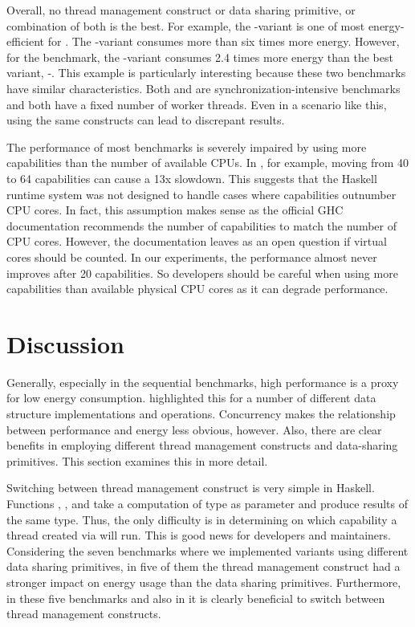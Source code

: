 Overall, no thread management construct or data sharing primitive, or combination of both is the best. For example, the \forkIO-\TMVar variant is one of most energy-efficient for \dining. The \forkOS-\TMVar variant consumes more than six times more energy. However, for the \chameneos benchmark, the \forkIO-\TMVar variant consumes 2.4 times more energy than the best variant, \forkIO-\MVar. This example is particularly interesting because these two benchmarks have similar characteristics. Both \dining and \chameneos are synchronization-intensive benchmarks and both have a fixed number of worker threads. Even in a scenario like this, using the same constructs can lead to discrepant results.
\newline

 The performance of most benchmarks is severely impaired by using more capabilities than the number of available CPUs. In \chameneos, for example, moving from 40 to 64 capabilities can cause a 13x slowdown. This suggests that the Haskell runtime system was not designed to handle cases where capabilities outnumber CPU cores. In fact, this assumption makes sense as the official GHC documentation recommends the number of capabilities to match the number of CPU cores. However, the documentation leaves as an open question if virtual cores should be counted. In our experiments, the performance almost never improves after 20 capabilities. So developers should be careful when using more capabilities than available physical CPU cores as it can degrade performance.



\section{Discussion}\label{sec:discussion}
Generally, especially in the sequential benchmarks, high performance is a proxy for low energy consumption.  highlighted this for a number of different data structure implementations and operations. Concurrency makes the relationship between performance and energy less obvious, however. Also, there are clear benefits in employing  different thread management constructs and data-sharing primitives. This section examines this in more detail.

Switching between thread management construct is very simple in Haskell. Functions \forkOn, \forkIO, and \forkOS take a computation of type \IO as parameter and produce results of the same type. Thus, the only difficulty is in determining on which capability a thread created via \forkOn will run. This is good news for developers and maintainers. Considering the seven benchmarks where we implemented variants using different data sharing primitives, in five of them the thread management construct had a stronger impact on energy usage than the data sharing primitives. Furthermore, in these five benchmarks and also in \warp it is clearly beneficial to switch between thread management constructs.

